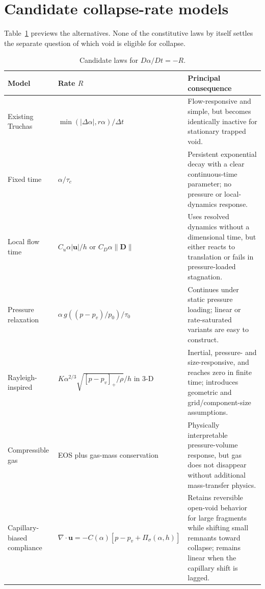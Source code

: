 \documentclass[11pt]{article}
\newcommand{\Dt}{\Delta t}
\newcommand{\pos}[1]{\left[#1\right]_+}
\newcommand{\divg}{\nabla\!\cdot}
\newcommand{\uv}{\boldsymbol{u}}
\begin{document}
\section{Candidate collapse-rate models}

Table~\ref{tab:candidates} previews the alternatives.  None of the constitutive laws by
itself settles the separate question of which void is eligible for collapse.

\begin{table}[htbp]
\centering
\small
\caption{Candidate laws for \(D\alpha/Dt=-R\).}
\label{tab:candidates}
\begin{tabularx}{\textwidth}{@{}>{\raggedright\arraybackslash}p{}
  >{\raggedright\arraybackslash}p{}X@{}}
\toprule
Model & Rate \(R\) & Principal consequence \\
\midrule
Existing Truchas &
  \(\min(|\Delta\alpha|,r\alpha)/\Dt\) &
  Flow-responsive and simple, but becomes identically inactive for stationary trapped
  void. \\
Fixed time &
  \(\alpha/\tau_c\) &
  Persistent exponential decay with a clear continuous-time parameter; no pressure or
  local-dynamics response. \\
Local flow time &
  \(C_u\alpha |\uv|/h\) or \(C_D\alpha\|\boldsymbol D\|\) &
  Uses resolved dynamics without a dimensional time, but either reacts to translation
  or fails in pressure-loaded stagnation. \\
Pressure relaxation &
  \(\alpha\,g((p-p_v)/p_0)/\tau_0\) &
  Continues under static pressure loading; linear or rate-saturated variants are easy to
  construct. \\
Rayleigh-inspired &
  \(K\alpha^{2/3}\sqrt{\pos{p-p_v}/\rho}/h\) in 3-D &
  Inertial, pressure- and size-responsive, and reaches zero in finite time; introduces
  geometric and grid/component-size assumptions. \\
Compressible gas &
  EOS plus gas-mass conservation &
  Physically interpretable pressure-volume response, but gas does not disappear without
  additional mass-transfer physics. \\
Capillary-biased compliance &
  \(\divg\uv=-C(\alpha)[p-p_v+\Pi_\sigma(\alpha,h)]\) &
  Retains reversible open-void behavior for large fragments while shifting small
  remnants toward collapse; remains linear when the capillary shift is lagged. \\
\bottomrule
\end{tabularx}
\end{table}
\end{document}
